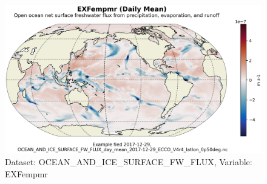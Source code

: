 \begin{figure}[H]
\centering
\includegraphics[scale=0.55]{../images/plots/latlon_plots/Ocean_and_Sea-Ice_Surface_Freshwater_Fluxes/EXFempmr.png}
\caption{Dataset: OCEAN\_AND\_ICE\_SURFACE\_FW\_FLUX, Variable: EXFempmr}
\label{tab:table-OCEAN_AND_ICE_SURFACE_FW_FLUX_EXFempmr-Plot}
\end{figure}
\pagebreak
